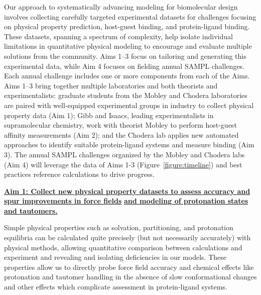 \documentclass[11pt]{article}
\begin{document}
Our approach to systematically advancing modeling for biomolecular design involves collecting carefully targeted experimental datasets for challenges focusing on physical property prediction, host-guest binding, and protein-ligand binding.
These datasets, spanning a spectrum of complexity, help isolate individual limitations in quantitative physical modeling to encourage and evaluate multiple solutions from the community.
Aims 1--3 focus on tailoring and generating this experimental data, while Aim 4 focuses on fielding annual SAMPL challenges. 
Each annual challenge includes one or more components from each of the Aims.
Aims 1--3 bring together multiple laboratories and both theorists and experimentalists: graduate students from the Mobley and Chodera laboratories are paired with well-equipped experimental groups in industry to collect physical property data (Aim 1); Gibb and Isaacs, leading experimentalists in supramolecular chemistry, work with theorist Mobley to perform host-guest affinity measurements (Aim 2); and the Chodera lab applies new automated approaches to identify suitable protein-ligand systems and measure binding (Aim 3).
The annual SAMPL challenges organized by the Mobley and Chodera labs (Aim 4) will leverage the data of Aims 1-3 (Figure~\ref{figure:timeline}) and best practices reference calculations to drive progress.

\textbf{\underline{Aim 1: Collect new physical property datasets to assess accuracy and spur improvements in force fields}}
\textbf{\underline{and modeling of protonation states and tautomers.}} 


Simple physical properties such as solvation, partitioning, and protonation equilibria can be calculated quite precisely (but not necessarily accurately) with physical methods, allowing quantitative comparison between calculations and experiment and revealing and isolating deficiencies in our models. 
These properties allow us to directly probe force field accuracy and chemical effects like protonation and tautomer handling in the absence of slow conformational changes and other effects which complicate assessment in protein-ligand systems. 
\end{document}
